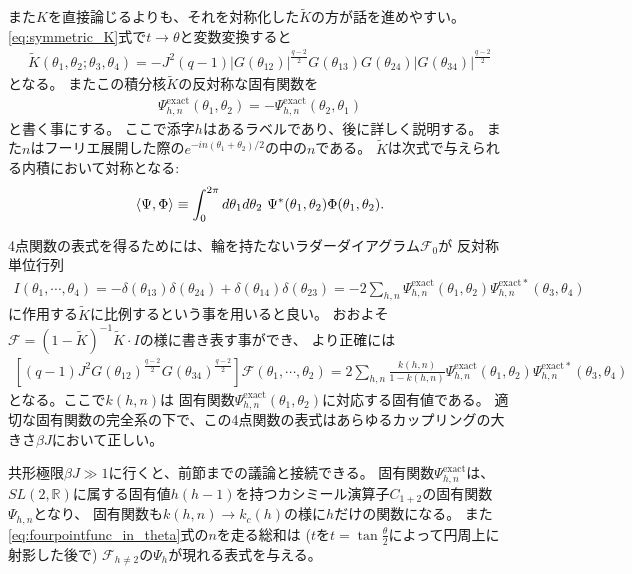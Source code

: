 また$K$を直接論じるよりも、それを対称化した$\tilde{K}$の方が話を進めやすい。
\eqref{eq:symmetric_K}式で$t\to\theta$と変数変換すると
\begin{align}
	\tilde{K}(\theta_1, \theta_2; \theta_3, \theta_4)
	= -J^2(q-1)
		|G(\theta_{12})|^{\frac{q-2}{2}}
		G(\theta_{13})G(\theta_{24})
		|G(\theta_{34})|^{\frac{q-2}{2}}
	\label{eq:symmetric_K_in_theta}
\end{align}
となる。
またこの積分核$\tilde{K}$の反対称な固有関数を
\begin{align}
	\Psi_{h,n}^{\mathrm{exact}}(\theta_1, \theta_2)
	= - \Psi_{h,n}^{\mathrm{exact}}(\theta_2, \theta_1)
\end{align}
と書く事にする。
ここで添字$h$はあるラベルであり、後に詳しく説明する。
また$n$はフーリエ展開した際の$e^{-in(\theta_1 + \theta_2)/2}$の中の$n$である。
$\tilde{K}$は次式で与えられる内積において対称となる:
\begin{align}
	\langle \Psi, \Phi \rangle \equiv
	\int_0^{2\pi}d\theta_1d\theta_2\ \Psi^*(\theta_1, \theta_2)\Phi(\theta_1, \theta_2).
	\label{eq:innerprod_in_finite_temp}
\end{align}

4点関数の表式を得るためには、輪を持たないラダーダイアグラム$\mathcal{F}_0$が
反対称単位行列
\begin{align}
	I(\theta_1, \cdots, \theta_4)
	= -\delta(\theta_{13})\delta(\theta_{24}) + \delta(\theta_{14})\delta(\theta_{23})
	= -2\sum_{h,n}\Psi_{h,n}^{\mathrm{exact}}(\theta_1, \theta_2)
		\Psi_{h,n}^{\mathrm{exact}*}(\theta_3, \theta_4)
\end{align}
に作用する$\tilde{K}$に比例するという事を用いると良い。
おおよそ$\mathcal{F} = (1 - \tilde{K})^{-1}\tilde{K}\cdot I$の様に書き表す事ができ、
より正確には
\begin{align}
	\left[(q-1)J^2G(\theta_{12})^{\frac{q-2}{2}}G(\theta_{34})^{\frac{q-2}{2}}\right]
	\mathcal{F}(\theta_1,\cdots,\theta_2) = 
	2\sum_{h,n}\frac{k(h,n)}{1-k(h,n)}
		\Psi_{h,n}^{\mathrm{exact}}(\theta_1, \theta_2)
		\Psi_{h,n}^{\mathrm{exact}*}(\theta_3, \theta_4)
	\label{eq:fourpointfunc_in_theta}
\end{align}
となる。ここで$k(h,n)$は
固有関数$\Psi_{h,n}^{\mathrm{exact}}(\theta_1, \theta_2)$に対応する固有値である。
適切な固有関数の完全系の下で、この4点関数の表式はあらゆるカップリングの大きさ$\beta J$において正しい。

共形極限$\beta J \gg 1$に行くと、前節までの議論と接続できる。
固有関数$\Psi_{h,n}^{\mathrm{exact}}$は、
$SL(2,\mathbb{R})$に属する固有値$h(h-1)$を持つカシミール演算子$C_{1+2}$の固有関数$\Psi_{h,n}$となり、
固有関数も$k(h,n)\to k_c(h)$の様に$h$だけの関数になる。
また\eqref{eq:fourpointfunc_in_theta}式の$n$を走る総和は
($t$を$t = \tan\frac{\theta}{2}$によって円周上に射影した後で)
$\mathcal{F}_{h\neq 2}$の$\Psi_h$が現れる表式を与える。

